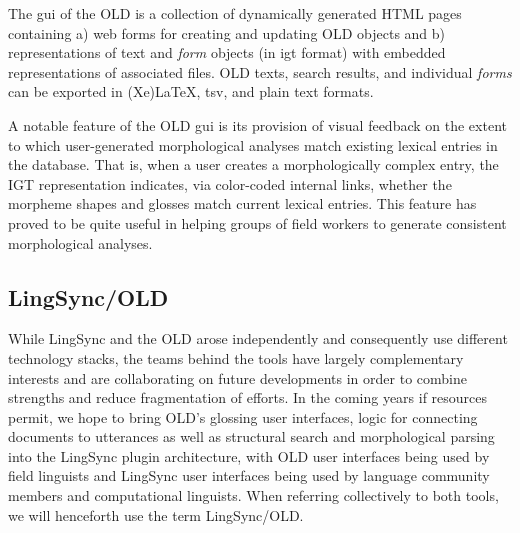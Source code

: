 \documentclass[11pt]{article}
\begin{document}
The \gls{gui} of the OLD is a collection of dynamically generated HTML pages
containing a) web forms for creating and updating OLD objects and b)
representations of text and \emph{form} objects (in \gls{igt} format) with
embedded representations of associated files. OLD texts, search results, and
individual \emph{forms} can be exported in (Xe)LaTeX, \gls{tsv}, and plain text
formats.

A notable feature of the OLD \gls{gui} is its provision of visual feedback on the
extent to which user-generated morphological analyses match existing lexical
entries in the database. That is, when a user creates a morphologically complex
entry, the IGT representation indicates, via color-coded internal links,
whether the morpheme shapes and glosses match current lexical entries. This
feature has proved to be quite useful in helping groups of field workers to
generate consistent morphological analyses.



\subsection{LingSync/OLD}

While LingSync and the OLD arose independently and consequently use different
technology stacks, the teams behind the tools have largely complementary interests and are collaborating on
future developments in order to combine strengths and reduce fragmentation of
efforts. In the coming years if resources permit, we hope to bring OLD's glossing user interfaces, 
logic for connecting documents to utterances as well as structural search and morphological 
parsing into the LingSync plugin architecture, with OLD user interfaces being used by field 
linguists and LingSync user interfaces being used by language community members and 
computational linguists. When referring collectively to both tools, we will henceforth use the
term LingSync/OLD.
\end{document}
